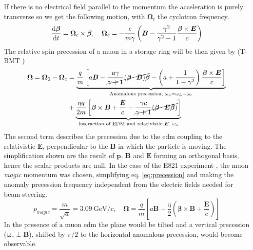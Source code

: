 \begin{refsection}
        If there is no electrical field parallel to the momentum the acceleration is purely transverse so we get the following motion, with $\bm{\Omega}_c$ the cyclotron frequency.
        \begin{equation}
            \dv{\bm{\beta}}{t}=\bm{\Omega}_c\times \bm{\beta}, \quad \bm{\Omega}_c = -\frac{e}{m\gamma}\left( \bm{B}- \frac{\gamma^2}{\gamma^2-1}\frac{\bm{\beta} \times \bm{E}}{c} \right)
        \end{equation}
        The relative spin precession of a muon in a storage ring will be then given by (T-BMT \cite{T-BMT})
        \begin{equation}
            \begin{split}
                \bm{\Omega}=\bm{\Omega}_0-\bm{\Omega}_c &=
                \underbrace{ 
                    \frac{q}{m}\left[ a\bm{B} -\cancel{\frac{a\gamma}{\gamma+1}(\bm{\beta}\cdot \bm{B})\bm{\beta}} - \left(  a+\frac{1}{1-\gamma^2}\right)\frac{\bm{\beta} \times \bm{E}}{c} \right]
                }_{\text{Anomalous precession, } \omega_a=\omega_L-\omega_c} \\&+
                \underbrace{
                    \frac{\eta q}{2m}\left[ \bm{\beta} \times \bm{B} + \frac{\bm{E}}{c}- \cancel{\frac{\gamma c}{\gamma+1}(\bm{\beta}\cdot\bm{E\beta})} \right]
                }_{\text{Interaction of EDM and relativistic $\bm{E}$, } \omega_a}
            \end{split}
            \label{eq:precession}
        \end{equation}
        The second term describes the precession due to the \gls{edm} coupling to the relativistic $\bm{E}$, perpendicular to the $\bm{B}$ in which the particle is moving. 
        The simplification shown are the result of $\bm{p}$, $\bm{B}$ and $\bm{E}$ forming an orthogonal basis, hence the scalar products are null.
        In the case of the E821 experiment \cite{muEDM:E821}, the muon \textit{magic} momentum was chosen, simplifying eq. \ref{eq:precession} and making the anomaly precession frequency independent from the electric fields needed for beam steering. 
        \begin{equation}
            p_{magic}=\frac{m}{\sqrt{a}}=3.09\ \text{GeV}/c, \quad
            \bm{\Omega} = \frac{q}{m} \left[ a\bm{B} +\frac{\eta}{2}\left( \bm{\beta}\times\bm{B} + \frac{\bm{E}}{c}\right) \right]
        \end{equation} 
        In the presence of a muon \gls{edm} the plane would be tilted and a vertical precession ($\bm{\omega}_e\perp\bm{B}$), shifted by $\pi/2$ to the horizontal anomalous precession, would become observable.\\


\end{refsection}
